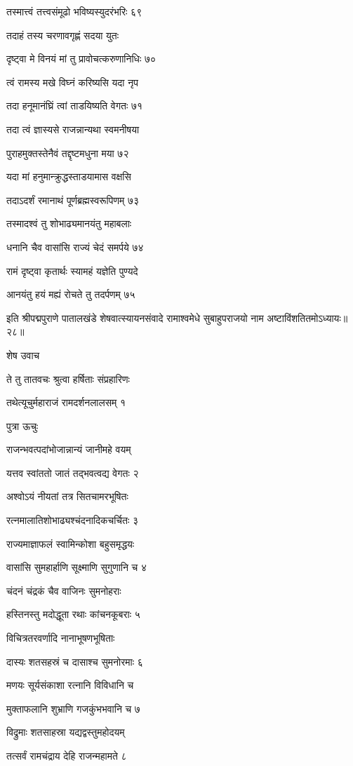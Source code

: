 तस्मात्त्वं तत्त्वसंमूढो भविष्यस्युदरंभरिः ६९

तदाहं तस्य चरणावगृह्णं सदया युतः

दृष्ट्वा मे विनयं मां तु प्रावोचत्करुणानिधिः ७०

त्वं रामस्य मखे विघ्नं करिष्यसि यदा नृप

तदा हनूमानंघ्रिं त्वां ताडयिष्यति वेगतः ७१

तदा त्वं ज्ञास्यसे राजन्नान्यथा स्वमनीषया

पुराहमुक्तस्तेनैवं तद्दृष्टमधुना मया ७२

यदा मां हनुमान्क्रुद्धस्ताडयामास वक्षसि

तदाऽदर्शं रमानाथं पूर्णब्रह्मस्वरूपिणम् ७३

तस्मादश्वं तु शोभाढ्यमानयंतु महाबलाः

धनानि चैव वासांसि राज्यं चेदं समर्पये ७४

रामं दृष्ट्वा कृतार्थः स्यामहं यज्ञेति पुण्यदे

आनयंतु हयं मह्यं रोचते तु तदर्पणम् ७५

इति श्रीपद्मपुराणे पातालखंडे शेषवात्स्यायनसंवादे रामाश्वमेधे सुबाहुपराजयो नाम अष्टाविंशतितमोऽध्यायः॥२८॥


शेष उवाच

ते तु तातवचः श्रुत्वा हर्षिताः संप्रहारिणः

तथेत्यूचुर्महाराजं रामदर्शनलालसम् १

पुत्रा ऊचुः

राजन्भवत्पदांभोजान्नान्यं जानीमहे वयम्

यत्तव स्वांततो जातं तद्भवत्वद्य वेगतः २

अश्वोऽयं नीयतां तत्र सितचामरभूषितः

रत्नमालातिशोभाढ्यश्चंदनादिकचर्चितः ३

राज्यमाज्ञाफलं स्वामिन्कोशा बहुसमृद्धयः

वासांसि सुमहार्हाणि सूक्ष्माणि सुगुणानि च ४

चंदनं चंद्रकं चैव वाजिनः सुमनोहराः

हस्तिनस्तु मदोद्धूता रथाः कांचनकूबराः ५

विचित्रतरवर्णादि नानाभूषणभूषिताः

दास्यः शतसहस्रं च दासाश्च सुमनोरमाः ६

मणयः सूर्यसंकाशा रत्नानि विविधानि च

मुक्ताफलानि शुभ्राणि गजकुंभभवानि च ७

विद्रुमाः शतसाहस्रा यद्यद्वस्तुमहोदयम्

तत्सर्वं रामचंद्राय देहि राजन्महामते ८

